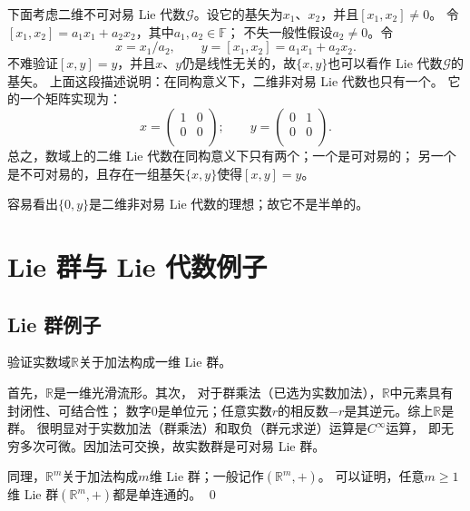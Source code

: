 下面考虑二维不可对易 Lie 代数$\mathscr{G}$。设它的基矢为$x_1$、$x_2$，并且$[x_1,x_2]\neq 0$。
令$[x_1,x_2]= a_1 x_1+ a_2 x_2$，其中$a_1,a_2\in \mathbb{F}$；
不失一般性假设$a_2\neq 0$。令
\begin{equation}
    x = x_1 / a_2,\qquad
    y = [x_1,x_2]= a_1 x_1+ a_2 x_2.
\end{equation}
不难验证$[x,y]=y$，并且$x$、$y$仍是线性无关的，故$\{x,y\}$也可以看作 Lie 代数$\mathscr{G}$的基矢。
上面这段描述说明：在同构意义下，二维非对易 Lie 代数也只有一个。
它的一个矩阵实现为：
\begin{equation}
    x=\left(
    \begin{array}{cc}
        1 & 0 \\
        0 & 0 \\
    \end{array}\right);\qquad
    y=\left(
    \begin{array}{cc}
        0 & 1 \\
        0 & 0 \\
    \end{array}
    \right).
\end{equation}
总之，数域上的二维 Lie 代数在同构意义下只有两个；一个是可对易的；
另一个是不可对易的，且存在一组基矢$\{x,y\}$使得$[x,y]=y$。

容易看出$\{0, y\}$是二维非对易 Lie 代数的理想；故它不是半单的。




\section{ Lie 群与 Lie 代数例子}\label{chlg:sec_example}


\subsection{ Lie 群例子}
\begin{example}\label{chlg:exam_Rplus}
    验证实数域$\mathbb{R}$关于加法构成一维 Lie 群。
    
    首先，$\mathbb{R}$是一维光滑流形。其次，
    对于群乘法（已选为实数加法），$\mathbb{R}$中元素具有封闭性、可结合性；
    数字$0$是单位元；任意实数$r$的相反数$-r$是其逆元。综上$\mathbb{R}$是群。
    很明显对于实数加法（群乘法）和取负（群元求逆）运算是$C^\infty$运算，
    即无穷多次可微。因加法可交换，故实数群是可对易 Lie 群。
    
    同理，$\mathbb{R}^m$关于加法构成$m$维 Lie 群；一般记作$(\mathbb{R}^m,+)$。 
    可以证明，任意$m \geqslant 1$维 Lie 群$(\mathbb{R}^m,+)$都是{\kaishu 单连通}的。 \qed
\end{example}


